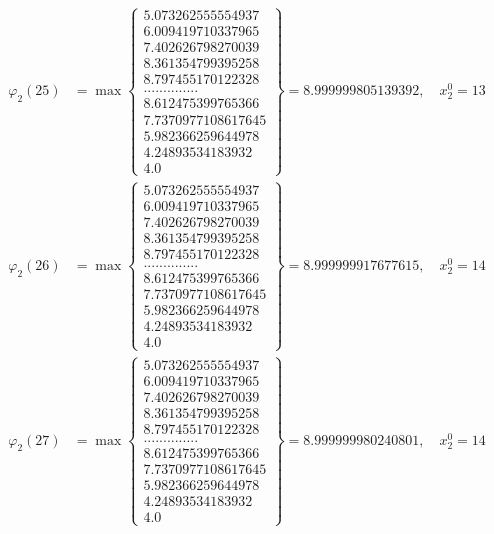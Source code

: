 \documentclass{article}
\begin{document}
\begin{align*}
  
  
  
\varphi_{2}(25) &= \max \left\{ \begin{array}{c}
5.073262555554937 \\
 6.009419710337965 \\
 7.402626798270039 \\
 8.361354799395258 \\
 8.797455170122328 \\
 .............. \\
 8.612475399765366 \\
 7.7370977108617645 \\
 5.982366259644978 \\
 4.24893534183932 \\
 4.0
\end{array} \right\} = 8.999999805139392, \quad x_{2}^0 = 13\\
  
  
  
  
\varphi_{2}(26) &= \max \left\{ \begin{array}{c}
5.073262555554937 \\
 6.009419710337965 \\
 7.402626798270039 \\
 8.361354799395258 \\
 8.797455170122328 \\
 .............. \\
 8.612475399765366 \\
 7.7370977108617645 \\
 5.982366259644978 \\
 4.24893534183932 \\
 4.0
\end{array} \right\} = 8.999999917677615, \quad x_{2}^0 = 14\\
  
  
  
  
\varphi_{2}(27) &= \max \left\{ \begin{array}{c}
5.073262555554937 \\
 6.009419710337965 \\
 7.402626798270039 \\
 8.361354799395258 \\
 8.797455170122328 \\
 .............. \\
 8.612475399765366 \\
 7.7370977108617645 \\
 5.982366259644978 \\
 4.24893534183932 \\
 4.0
\end{array} \right\} = 8.999999980240801, \quad x_{2}^0 = 14\\
  

\end{align*}
\end{document}
